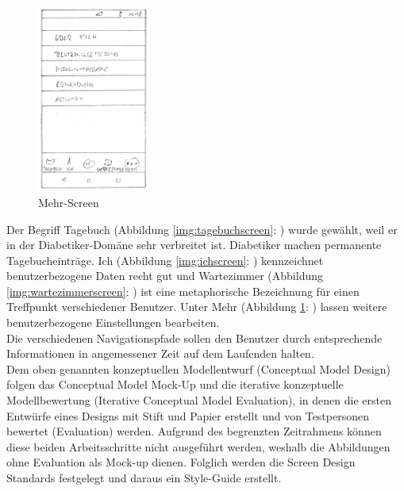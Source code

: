 \begin{figure}[H]
	\centering
	\includegraphics[width=0.33\textwidth]{images/mehrscreen.png}
	\captionsetup{justification=centering}
	\caption{Mehr-Screen}
	\label{img:mehrscreen}
\end{figure}
Der Begriff \glqq Tagebuch\grqq{} (Abbildung \ref{img:tagebuchscreen}: \glqq {}\grqq{}) wurde gewählt, weil er in der Diabetiker-Domäne sehr verbreitet ist. Diabetiker machen permanente \glqq Tagebucheinträge\grqq{}. \glqq Ich\grqq{} (Abbildung \ref{img:ichscreen}: \glqq {}\grqq{}) kennzeichnet benutzerbezogene Daten recht gut und \glqq Wartezimmer\grqq{} (Abbildung \ref{img:wartezimmerscreen}: \glqq {}\grqq{}) ist eine metaphorische Bezeichnung für einen Treffpunkt verschiedener Benutzer. Unter \glqq Mehr\grqq{} (Abbildung \ref{img:mehrscreen}: \glqq {}\grqq{}) lassen weitere benutzerbezogene Einstellungen bearbeiten. \\
Die verschiedenen Navigationspfade sollen den Benutzer durch entsprechende Informationen in angemessener Zeit auf dem Laufenden halten.\\
Dem oben genannten konzeptuellen Modellentwurf (Conceptual Model Design) folgen das Conceptual Model Mock-Up und die iterative konzeptuelle Modellbewertung (Iterative Conceptual Model Evaluation), in denen die ersten Entwürfe eines Designs mit Stift und Papier erstellt und von Testpersonen bewertet (Evaluation) werden. Aufgrund des begrenzten Zeitrahmens können diese beiden Arbeitsschritte nicht ausgeführt werden, weshalb die Abbildungen ohne Evaluation als Mock-up dienen. Folglich werden die Screen Design Standards festgelegt und daraus ein Style-Guide erstellt.
